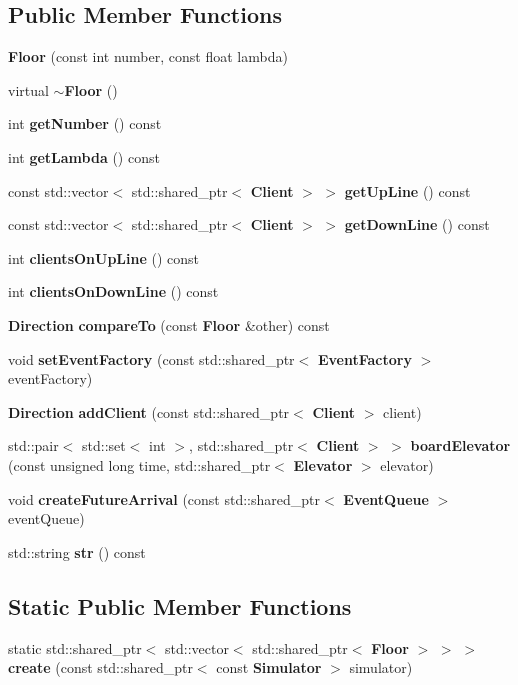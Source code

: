 \subsection*{Public Member Functions}
\begin{DoxyCompactItemize}
\item 
{\bf Floor} (const int number, const float lambda)
\item 
virtual {\bf $\sim$\+Floor} ()
\item 
int {\bf get\+Number} () const 
\item 
int {\bf get\+Lambda} () const 
\item 
const std\+::vector$<$ std\+::shared\+\_\+ptr$<$ {\bf Client} $>$ $>$ {\bf get\+Up\+Line} () const 
\item 
const std\+::vector$<$ std\+::shared\+\_\+ptr$<$ {\bf Client} $>$ $>$ {\bf get\+Down\+Line} () const 
\item 
int {\bf clients\+On\+Up\+Line} () const 
\item 
int {\bf clients\+On\+Down\+Line} () const 
\item 
{\bf Direction} {\bf compare\+To} (const {\bf Floor} \&other) const 
\item 
void {\bf set\+Event\+Factory} (const std\+::shared\+\_\+ptr$<$ {\bf Event\+Factory} $>$ event\+Factory)
\item 
{\bf Direction} {\bf add\+Client} (const std\+::shared\+\_\+ptr$<$ {\bf Client} $>$ client)
\item 
std\+::pair$<$ std\+::set$<$ int $>$, std\+::shared\+\_\+ptr$<$ {\bf Client} $>$ $>$ {\bf board\+Elevator} (const unsigned long time, std\+::shared\+\_\+ptr$<$ {\bf Elevator} $>$ elevator)
\item 
void {\bf create\+Future\+Arrival} (const std\+::shared\+\_\+ptr$<$ {\bf Event\+Queue} $>$ event\+Queue)
\item 
std\+::string {\bf str} () const 
\end{DoxyCompactItemize}
\subsection*{Static Public Member Functions}
\begin{DoxyCompactItemize}
\item 
static std\+::shared\+\_\+ptr$<$ std\+::vector$<$ std\+::shared\+\_\+ptr$<$ {\bf Floor} $>$ $>$ $>$ {\bf create} (const std\+::shared\+\_\+ptr$<$ const {\bf Simulator} $>$ simulator)
\end{DoxyCompactItemize}


